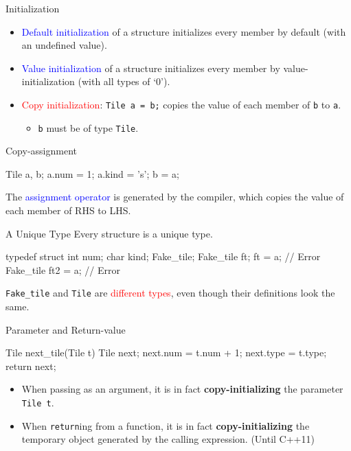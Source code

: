 \documentclass{beamer}
\newcommand{\red}[1]{\textcolor{red}{#1}}
\newcommand{\blue}[1]{\textcolor{blue}{#1}}
\newcommand{\ttt}[1]{\texttt{#1}}
\theoremstyle{definition}
\begin{document}
\begin{frame}[fragile]{Initialization}
    \begin{itemize}
        \item \blue{Default initialization} of a structure initializes every member by default (with an undefined value).
        \item \blue{Value initialization} of a structure initializes every member by value-initialization (with all types of `0').
        \pause
        \item \red{Copy initialization}: \ttt{Tile a = b;} copies the value of each member of \ttt{b} to \ttt{a}.
        \begin{itemize}
            \item \ttt{b} must be of type \ttt{Tile}.
        \end{itemize}
    \end{itemize}
\end{frame}

\begin{frame}[fragile]{Copy-assignment}
    \begin{cpp}
Tile a, b;
a.num = 1; a.kind = 's';
b = a;
    \end{cpp}
    The \blue{assignment operator} is generated by the compiler, which copies the value of each member of RHS to LHS.
\end{frame}

\begin{frame}[fragile]{A Unique Type}
    Every structure is a unique type.
    \pause
    \begin{cpp}
typedef struct {
  int num;
  char kind;
} Fake_tile;
Fake_tile ft;
ft = a;             // Error
Fake_tile ft2 = a;  // Error
    \end{cpp}
    \ttt{Fake\_tile} and \ttt{Tile} are \red{different types}, even though their definitions look the same.
\end{frame}

\begin{frame}[fragile]{Parameter and Return-value}
    \begin{cpp}
Tile next_tile(Tile t) {
  Tile next;
  next.num = t.num + 1;
  next.type = t.type;
  return next;
}
    \end{cpp}
    \pause
    \begin{itemize}
        \item When passing as an argument, it is in fact \textbf{copy-initializing} the parameter \ttt{Tile t}.
        \item When \ttt{return}ing from a function, it is in fact \textbf{copy-initializing} the temporary object generated by the calling expression. (Until C++11)
    \end{itemize}
\end{frame}
\end{document}
